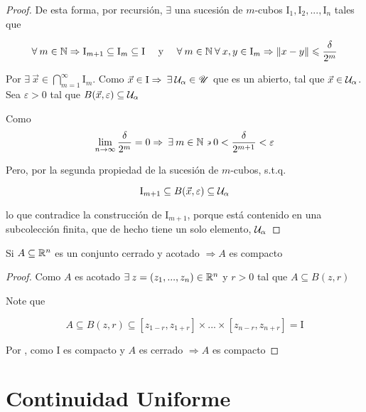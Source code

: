 \begin{proof}
     De esta forma, por recursión, $\exists$ una sucesión de $m$-cubos $\mathrm{I}_1, \mathrm{I}_2, ..., \mathrm{I}_n$ tales que

     \begin{align*}
         \forall \: m \in \mathbb{N} \Rightarrow \mathrm{I}_{m+1} \subseteq \mathrm{I}_{m} \subseteq \mathrm{I} && \text{ y } && \forall \: m \in \mathbb{N} \: \forall \: x,y \in \mathrm{I}_m \Rightarrow \norm{x-y} \leqslant \frac{\delta}{2^m} 
     \end{align*}

     Por  $\exists \: \vec{x} \in \bigcap_{m = 1}^{\infty} \mathrm{I}_m$. Como $\vec{x} \in \mathrm{I} \Rightarrow \: \exists \: \mathcal{U}_\alpha \in \mathscr{U}$ que es un abierto, tal que $\vec{x} \in \mathcal{U}_\alpha$. Sea $\varepsilon > 0$ tal que $B(\vec{x},\varepsilon) \subseteq \mathcal{U}_\alpha$

     Como 
     $$\lim_{n \to \infty} \frac{\delta}{2^m} = 0 \Rightarrow \: \exists \: m \in \N \backepsilon 0 < \frac{\delta}{2^{m+1}} < \varepsilon$$

     Pero, por la segunda propiedad de la sucesión de $m$-cubos, s.t.q. 

     $$\mathrm{I}_{m+1} \subseteq B(\vec{x}, \varepsilon) \subseteq \mathcal{U}_\alpha$$

     lo que contradice la construcción de $\mathrm{I}_{m+1}$, porque está contenido en una subcolección finita, que de hecho tiene un solo elemento, $\mathcal{U}_\alpha$
\end{proof}

\begin{theorem} \label{theomheineborel}
    Si $A \subseteq \mathbb{R}^n$ es un conjunto cerrado y acotado $\Rightarrow A$ es compacto
\end{theorem}

\begin{proof}
    Como $A$ es acotado $\exists \: z = (z_1, ..., z_n) \in \mathbb{R}^n$ y $r>0$ tal que $A \subseteq B(z,r)$

    Note que

    $$A \subseteq B(z,r) \subseteq [z_{1-r},z_{1+r}] \times ... \times [z_{n-r},z_{n+r}] = \mathrm{I} $$

    Por , como $\mathrm{I}$ es compacto y $A$ es cerrado $\Rightarrow A$ es compacto
\end{proof}

\section{Continuidad Uniforme}

